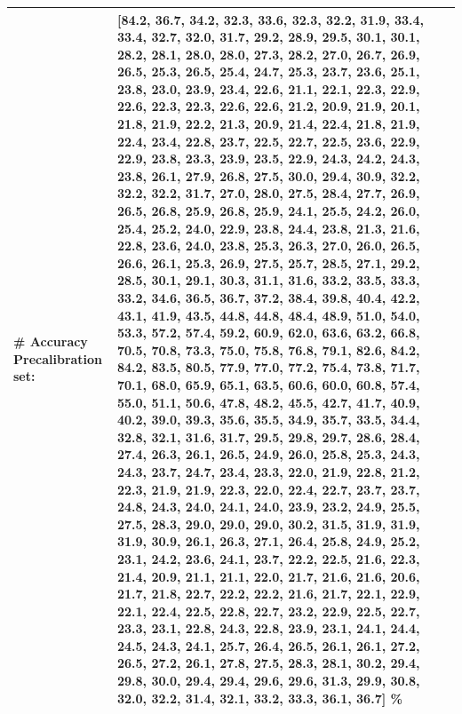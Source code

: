 \documentclass[parskip=half]{scrartcl}
\begin{document}
\begin{tabular}{l|l}
        # \textbf{Accuracy Precalibration set:} & [84.2, 36.7, 34.2, 32.3, 33.6, 32.3, 32.2, 31.9, 33.4, 33.4, 32.7, 32.0, 31.7, 29.2, 28.9, 29.5, 30.1, 30.1, 28.2, 28.1, 28.0, 28.0, 27.3, 28.2, 27.0, 26.7, 26.9, 26.5, 25.3, 26.5, 25.4, 24.7, 25.3, 23.7, 23.6, 25.1, 23.8, 23.0, 23.9, 23.4, 22.6, 21.1, 22.1, 22.3, 22.9, 22.6, 22.3, 22.3, 22.6, 22.6, 21.2, 20.9, 21.9, 20.1, 21.8, 21.9, 22.2, 21.3, 20.9, 21.4, 22.4, 21.8, 21.9, 22.4, 23.4, 22.8, 23.7, 22.5, 22.7, 22.5, 23.6, 22.9, 22.9, 23.8, 23.3, 23.9, 23.5, 22.9, 24.3, 24.2, 24.3, 23.8, 26.1, 27.9, 26.8, 27.5, 30.0, 29.4, 30.9, 32.2, 32.2, 32.2, 31.7, 27.0, 28.0, 27.5, 28.4, 27.7, 26.9, 26.5, 26.8, 25.9, 26.8, 25.9, 24.1, 25.5, 24.2, 26.0, 25.4, 25.2, 24.0, 22.9, 23.8, 24.4, 23.8, 21.3, 21.6, 22.8, 23.6, 24.0, 23.8, 25.3, 26.3, 27.0, 26.0, 26.5, 26.6, 26.1, 25.3, 26.9, 27.5, 25.7, 28.5, 27.1, 29.2, 28.5, 30.1, 29.1, 30.3, 31.1, 31.6, 33.2, 33.5, 33.3, 33.2, 34.6, 36.5, 36.7, 37.2, 38.4, 39.8, 40.4, 42.2, 43.1, 41.9, 43.5, 44.8, 44.8, 48.4, 48.9, 51.0, 54.0, 53.3, 57.2, 57.4, 59.2, 60.9, 62.0, 63.6, 63.2, 66.8, 70.5, 70.8, 73.3, 75.0, 75.8, 76.8, 79.1, 82.6, 84.2, 84.2, 83.5, 80.5, 77.9, 77.0, 77.2, 75.4, 73.8, 71.7, 70.1, 68.0, 65.9, 65.1, 63.5, 60.6, 60.0, 60.8, 57.4, 55.0, 51.1, 50.6, 47.8, 48.2, 45.5, 42.7, 41.7, 40.9, 40.2, 39.0, 39.3, 35.6, 35.5, 34.9, 35.7, 33.5, 34.4, 32.8, 32.1, 31.6, 31.7, 29.5, 29.8, 29.7, 28.6, 28.4, 27.4, 26.3, 26.1, 26.5, 24.9, 26.0, 25.8, 25.3, 24.3, 24.3, 23.7, 24.7, 23.4, 23.3, 22.0, 21.9, 22.8, 21.2, 22.3, 21.9, 21.9, 22.3, 22.0, 22.4, 22.7, 23.7, 23.7, 24.8, 24.3, 24.0, 24.1, 24.0, 23.9, 23.2, 24.9, 25.5, 27.5, 28.3, 29.0, 29.0, 29.0, 30.2, 31.5, 31.9, 31.9, 31.9, 30.9, 26.1, 26.3, 27.1, 26.4, 25.8, 24.9, 25.2, 23.1, 24.2, 23.6, 24.1, 23.7, 22.2, 22.5, 21.6, 22.3, 21.4, 20.9, 21.1, 21.1, 22.0, 21.7, 21.6, 21.6, 20.6, 21.7, 21.8, 22.7, 22.2, 22.2, 21.6, 21.7, 22.1, 22.9, 22.1, 22.4, 22.5, 22.8, 22.7, 23.2, 22.9, 22.5, 22.7, 23.3, 23.1, 22.8, 24.3, 22.8, 23.9, 23.1, 24.1, 24.4, 24.5, 24.3, 24.1, 25.7, 26.4, 26.5, 26.1, 26.1, 27.2, 26.5, 27.2, 26.1, 27.8, 27.5, 28.3, 28.1, 30.2, 29.4, 29.8, 30.0, 29.4, 29.4, 29.6, 29.6, 31.3, 29.9, 30.8, 32.0, 32.2, 31.4, 32.1, 33.2, 33.3, 36.1, 36.7] \% \\ \hline

\end{tabular}
\end{document}
